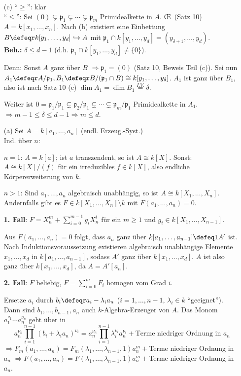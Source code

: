 \begin{Bew}
\begin{enumerate}
\item[(c)] ``$\geq$'': klar\\
``$\leq$'': Sei $(0)\subsetneq \mathfrak{p}_1\subsetneq \cdots\subsetneq \mathfrak{p}_m$ Primidealkette
in $A$. \OE\ (Satz 10) $A=k[x_1,\ldots, x_n]$. Nach (b) existiert eine Einbettung 
$B\defeqr k[y_1,\ldots,y_d]\hookrightarrow A$ mit $\mathfrak{p}_1\cap k[y_1,\ldots, y_d]
=(y_{\delta+1},\ldots, y_d)$.\\
\textbf{Beh.:} $\delta\leq d-1$ (d.h. $\mathfrak{p}_1\cap k[y_1,\ldots,y_d]\neq \{0\}$).

Denn: Sonst $A$ ganz \"uber $B$ $\Rightarrow \mathfrak{p}_1=(0)$ (Satz 10, Beweis Teil (c)).
Sei nun $A_1\defeqr A/\mathfrak{p}_1, B_1\defeqr B/(\mathfrak{p}_1\cap B)
\cong k[y_1,\ldots, y_\delta]$. $A_1$ ist ganz \"uber $B_1$, also ist nach Satz 10 (c)
$\dim{A_1}=\dim{B_1} \stackrel{I.V.}{=}\delta$.

Weiter ist $0=\mathfrak{p}_1/\mathfrak{p}_1\subsetneq \mathfrak{p}_2/\mathfrak{p}_1
\subsetneq \cdots \subsetneq \mathfrak{p}_m/\mathfrak{p}_1$ Primidealkette in $A_1$.
$\Rightarrow m-1\leq \delta \leq d-1 \Rightarrow m\leq d$.

\item[(a)] Sei $A=k[a_1,\ldots, a_n]$  (endl. Erzeug.-Syst.)\\
Ind. \"uber $n$: 

$n=1$: $A=k[a]$; ist $a$ transzendent, so ist $A\cong k[X]$. Sonst: $A\cong k[X]/(f)$
f\"ur ein irreduzibles $f\in k[X]$, also endliche K\"orpererweiterung von $k$.

$n> 1$: Sind $a_1,\ldots, a_n$ algebraisch unabh\"angig, so ist $A\cong k[X_1,\ldots, X_n]$.
Andernfalls gibt es $F\in k[X_1, \ldots, X_n]\setminus k$ mit $F(a_1, \ldots,
a_n)=0$.

\textbf{1. Fall}: $F=X_n^m+\sum_{i=0}^{m-1}g_i X_n^i$ f\"ur ein $m\geq 1$ und
$g_i\in k[X_1,\ldots, X_{n-1}]$.

Aus $F(a_1, \ldots, a_n)=0$ folgt, dass $a_n$ ganz \"uber $k[a_1, \ldots,
a_{n-1}]\defeql A'$ ist.
Nach Induktionsvoraussetzung existieren algebraisch unabh\"angige Elemente 
$x_1,\ldots,x_d$ in
$k[a_1,\ldots, a_{n-1}]$, sodass $A'$ ganz \"uber $k[x_1,\ldots,x_d]$. $A$ ist also ganz
\"uber $k[x_1, \ldots, x_d]$, da $A=A'[a_n]$.

\textbf{2. Fall}: $F$ beliebig, $F=\sum_{i=0}^{m}F_i$ homogen vom Grad $i$. 

Ersetze $a_i$ durch $b_i\defeqr a_i-\lambda_i a_n$ ($i=1,\ldots, n-1$, $\lambda_i\in k$
``geeignet''). Dann sind $b_1,\ldots, b_{n-1},a_n$ auch $k$-Algebra-Erzeuger von $A$.
Das Monom $a_1^{\nu_1}\cdots a_n^{\nu_n}$ geht \"uber in 
\[
a_n^{\nu_n}\prod_{i=1}^{n-1}(b_i+\lambda_i a_n)^{\nu_i}
=a_n^{\nu_n}\prod_{i=1}^{n-1} \lambda_i^{\nu_i} a_n^{\nu_i}+
\text{Terme niedriger Ordnung in } a_n
\]
$\Rightarrow F_m(a_1,\ldots,
a_n)=F_m(\lambda_1,\ldots,\lambda_{n-1},1)a_n^m+$Terme niedriger Ordnung in 
$a_n$ $\Rightarrow F(a_1,\ldots,
a_n)=F(\lambda_1,\ldots,\lambda_{n-1},1)a_n^m+$Terme niedriger Ordnung in $a_n$.


\end{enumerate}
\end{Bew}
